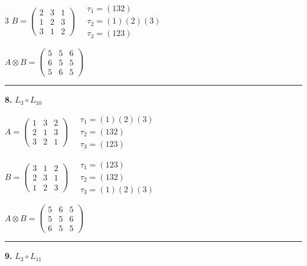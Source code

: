 \begin{multicols}{3}
$B = \begin{pmatrix} 2 & 3 & 1 \\ 1 & 2 & 3 \\ 3 & 1 & 2 \end{pmatrix} \quad \begin{matrix} \tau_{1}=(1 3 2) \\ \tau_{2}=(1)(2)(3) \\ \tau_{3}=(1 2 3) \end{matrix}$

$A \otimes B = \begin{pmatrix} 5 & 5 & 6 \\ 6 & 5 & 5 \\ 5 & 6 & 5 \end{pmatrix}$

\vspace{0.3em}
\hrule
\vspace{0.3em}

\noindent\textbf{8.} $L_{3} \circ L_{10}$

$A = \begin{pmatrix} 1 & 3 & 2 \\ 2 & 1 & 3 \\ 3 & 2 & 1 \end{pmatrix} \quad \begin{matrix} \tau_{1}=(1)(2)(3) \\ \tau_{2}=(1 3 2) \\ \tau_{3}=(1 2 3) \end{matrix}$

$B = \begin{pmatrix} 3 & 1 & 2 \\ 2 & 3 & 1 \\ 1 & 2 & 3 \end{pmatrix} \quad \begin{matrix} \tau_{1}=(1 2 3) \\ \tau_{2}=(1 3 2) \\ \tau_{3}=(1)(2)(3) \end{matrix}$

$A \otimes B = \begin{pmatrix} 5 & 6 & 5 \\ 5 & 5 & 6 \\ 6 & 5 & 5 \end{pmatrix}$

\vspace{0.3em}
\hrule
\vspace{0.3em}

\noindent\textbf{9.} $L_{3} \circ L_{11}$


\end{multicols}
